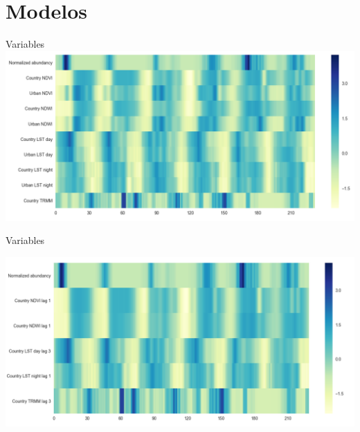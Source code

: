 \documentclass[10pt]{beamer}
\begin{document}
\section{Modelos}

\begin{frame}{Variables}
  \includegraphics[width=1\textwidth]{all_variables.png}


\end{frame}

\begin{frame}{Variables}


  \includegraphics[width=1\textwidth]{selected_variables.png}


\end{frame}
\end{document}
